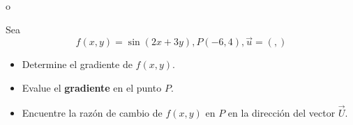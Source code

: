 o\documentclass[12pt]{article}
\begin{document}
Sea $$f(x, y) = \sin{(2x + 3y)}, P(−6, 4), \vec{u}=\left(,\right)$$

\begin{itemize}[format=\textbf]

\item Determine el gradiente de $f(x, y)$.

\item Evalue el \textbf{gradiente} en el punto $P$.

\item Encuentre la razón de cambio de $f(x, y)$ en $P$ en la dirección del vector $\vec{U}$.

\end{itemize}
\end{document}
